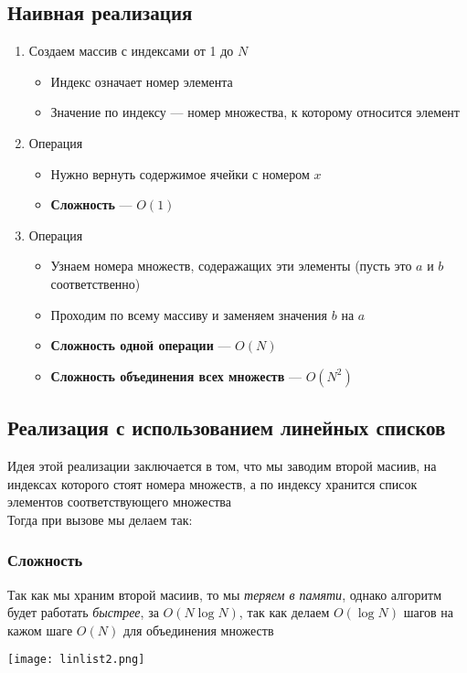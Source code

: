 \documentclass[a4paper]{article}
\begin{document}
\subsection{Наивная реализация}
\begin{enumerate}
    \item Создаем массив с индексами от 1 до $N$
    \begin{itemize}
        \item Индекс означает номер элемента
        \item Значение по индексу — номер множества, к которому относится элемент
    \end{itemize}
    \item Операция 
    \begin{itemize}
        \item Нужно вернуть содержимое ячейки с номером $x$
        \item \textbf{Сложность} — $O(1)$
    \end{itemize}
    \item Операция 
    \begin{itemize}
        \item Узнаем номера множеств, содеражащих эти элементы (пусть это $a$ и $b$ соответственно)
        \item Проходим по всему массиву и заменяем значения $b$ на $a$
        \item \textbf{Сложность одной операции} — $O(N)$
        \item \textbf{Сложность объединения всех множеств} — $O(N^2)$
    \end{itemize}
\end{enumerate}

\subsection{Реализация с использованием линейных списков}
Идея этой реализации заключается в том, что мы заводим второй масиив, на индексах которого стоят номера множеств, а по индексу хранится список элементов соответствующего множества\\[2mm]
\indent Тогда при вызове  мы делаем так: 
\subsubsection*{Сложность}
Так как мы храним второй масиив, то мы \textit{теряем в памяти}, однако алгоритм будет работать \textit{быстрее}, за $O(N\log N)$, так как делаем $O(\log N)$ шагов на кажом шаге $O(N)$ для объединения множеств
\begin{center}
    \texttt{[image: linlist2.png]}
    \label{union-find-lin}
\end{center}
\end{document}
